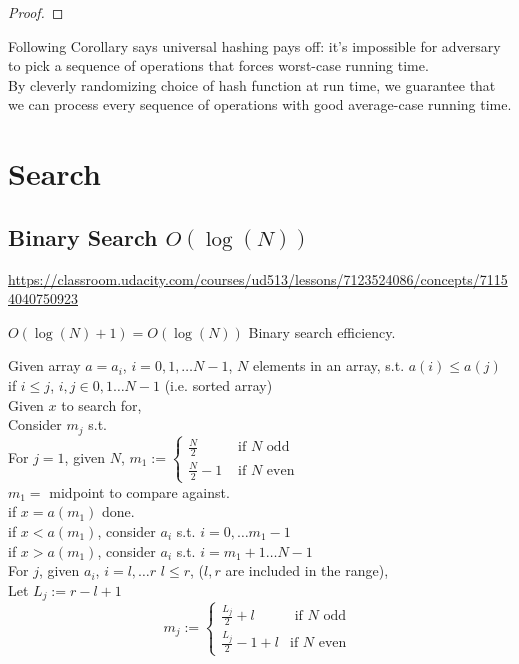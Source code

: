 \documentclass[10pt]{amsart}
\begin{document}
\begin{multicols*}{2}
\begin{proof}
\end{proof}

Following Corollary says universal hashing pays off: it's impossible for adversary to pick a sequence of operations that forces worst-case running time.  \\
By cleverly randomizing choice of hash function at run time, we guarantee that we can process every sequence of operations with good average-case running time.

\section{Search}

\subsection{Binary Search $O(\log{(N)})$}

\url{https://classroom.udacity.com/courses/ud513/lessons/7123524086/concepts/71154040750923}

$O(\log{(N)} + 1) = O(\log{(N)})$ Binary search efficiency.

Given array $a=a_i$, $i=0,1,\dots N-1$, $N$ elements in an array, s.t. $a(i) \leq a(j)$ if $i\leq j$, $i,j \in 0, 1\dots N-1$ (i.e. sorted array) \\
Given $x$ to search for, \\
Consider $m_j$ s.t. \\
For $j=1$, given $N$, $m_1 := \begin{cases} \frac{N}{2} & \text{ if $N$ odd } \\
\frac{N}{2} -1 & \text{ if $N$ even } \end{cases} $ \\

$m_1=$ midpoint to compare against. \\


if $x=a(m_1)$ done. \\
if $x< a(m_1)$, consider $a_i$ s.t. $i=0, \dots m_1-1$ \\
if $x>a(m_1)$, consider $a_i$ s.t. $i=m_1+1 \dots N-1$ \\

For $j$, given $a_i$, $i=l, \dots r$ $l\leq r$, ($l, r$ are included in the range), \\
Let $L_j := r - l +1$ \\
\[
m_j := \begin{cases} \frac{L_j}{2} + l & \text{ if $N$ odd } \\
	\frac{L_j}{2} - 1 + l & \text{if $N$ even } \end{cases} 
\]


\end{multicols*}
\end{document}
